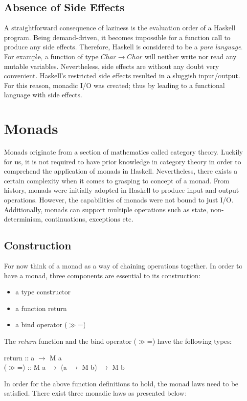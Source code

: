\documentclass[a4paper, onecolumn]{article}
\begin{document}
\subsection{Absence of Side Effects}

A straightforward consequence of laziness is the evaluation order of a Haskell program. Being demand-driven, it becomes impossible for a function call to produce any side effects. Therefore, Haskell is considered to be a \textit{pure language}. For example, a function of type $Char \rightarrow Char$ will neither write nor read any mutable variables. Nevertheless, side effects are without any doubt very convenient. Haskell's restricted side effects resulted in a sluggish input/output. For this reason, monadic I/O was created; thus by leading to a functional language with side effects. 
\section{Monads}
Monads originate from a section of mathematics called category theory. Luckily for us, it is not required to have prior knowledge in category theory in order to comprehend the application of monads in Haskell. 
Nevertheless, there exists a certain complexity when it comes to grasping to concept of a monad. From history, monads were initially adopted in Haskell to produce input and output operations. However, the capabilities of monads were not bound to just I/O. Additionally, monads can support multiple operations such as state, non-determinism, continuations, exceptions etc.
\subsection{Construction}
For now think of a monad as a way of chaining operations together. 
In order to have a monad, three components are essential to its construction: 
\begin{itemize}
    \item a type constructor
    \item a function return
    \item a bind operator ($\gg$=)
\end{itemize}
The \textit{return} function and the bind operator ($\gg$=) have the following types: 

\begin{center}
   return   :: a $\rightarrow$ M a \\
   ($\gg$=) :: M a $\rightarrow$ (a $\rightarrow$ M b) $\rightarrow$ M b 
   \end{center}
In order for the above function definitions to hold, the monad laws need to be satisfied. There exist three monadic laws as presented below: 
\end{document}
